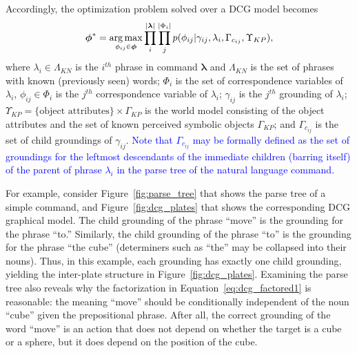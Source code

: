 Accordingly, the optimization problem solved over a DCG model becomes
\begin{equation}
\label{eq:dcg_factored1}
\begin{split}
\boldsymbol{\phi}^* = \operatorname*{\arg\max}_{\phi_{ij} \in \boldsymbol{\phi}} \prod_{i}^{|\boldsymbol{\lambda}|} \prod_{j}^{|\Phi_i|} p(\phi_{ij}|\gamma_{ij},\lambda_i,\Gamma_{c_{ij}} , \Upsilon_{KP}),
\end{split}
\end{equation}
where $\lambda_i \in \Lambda_{KN}$ is the $i^{th}$ phrase in command $\boldsymbol{\lambda}$ and $\Lambda_{KN}$ is the set of phrases with known (previously seen) words; $\Phi_i$ is the set of correspondence variables of $\lambda_i$, $\phi_{ij} \in \Phi_i$ is the $j^{th}$ correspondence variable of $\lambda_i$; $\gamma_{ij}$ is the $j^{th}$ grounding of $\lambda_i$; $\Upsilon_{KP} = \{\text{object attributes}\} \times \Gamma_{KP}$ is the world model consisting of the object attributes and the set of known perceived symbolic objects $\Gamma_{KP}$; and  $\Gamma_{c_{ij}}$ is the set of child groundings of $\gamma_{ij}$. \textcolor{blue}{Note that $\Gamma_{c_{ij}}$ may be formally defined as the set of groundings for the leftmost descendants of the immediate children (barring itself) of the parent of phrase $\lambda_i$ in the parse tree of the natural language command.} 

For example, consider Figure~\ref{fig:parse_tree} that shows the parse tree of a simple command, and Figure~\ref{fig:dcg_plates} that shows the corresponding DCG graphical model. The child grounding of the phrase ``move'' is the grounding for the phrase ``to.'' Similarly, the child grounding of the phrase ``to'' is the grounding for the phrase ``the cube'' (determiners such as ``the'' may be collapsed into their nouns). Thus, in this example, each grounding has exactly one child grounding, yielding the inter-plate structure in Figure~\ref{fig:dcg_plates}.
Examining the parse tree also reveals why the factorization in Equation~\ref{eq:dcg_factored1} is reasonable: the meaning ``move'' should be conditionally independent of the noun ``cube'' given the prepositional phrase.
After all, the correct grounding of the word ``move'' is an action that does not depend on whether the target is a cube or a sphere, but it does depend on the position of the cube.


